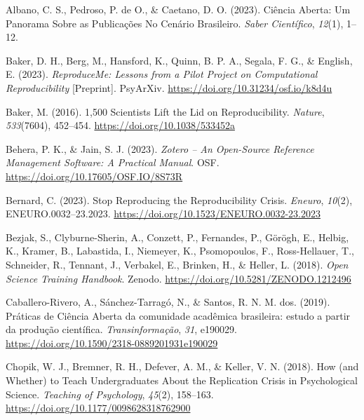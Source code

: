\documentclass[
  a4paper,
]{article}
\newlength{\cslhangindent}
\newenvironment{CSLReferences}[2] %
 {\begin{list}{}{%
  \setlength{\itemindent}{0pt}
  \setlength{\leftmargin}{0pt}
  \setlength{\parsep}{0pt}
  \ifodd #1
   \setlength{\leftmargin}{\cslhangindent}
   \setlength{\itemindent}{-1\cslhangindent}
  \fi
  \setlength{\itemsep}{#2\baselineskip}}}
 {\end{list}}
\begin{document}
\label{refs}
\begin{CSLReferences}{1}{0}
Albano, C. S., Pedroso, P. de O., \& Caetano, D. O. (2023). Ci{ê}ncia
{Aberta}: {Um Panorama} Sobre as {Publica{ç}{õ}es} No {Cen{á}rio
Brasileiro}. \emph{Saber Cient{í}fico}, \emph{12}(1), 1--12.

Baker, D. H., Berg, M., Hansford, K., Quinn, B. P. A., Segala, F. G., \&
English, E. (2023). \emph{{ReproduceMe}: Lessons from a Pilot Project on
Computational Reproducibility} {[}Preprint{]}. PsyArXiv.
\url{https://doi.org/10.31234/osf.io/k8d4u}

Baker, M. (2016). 1,500 Scientists Lift the Lid on Reproducibility.
\emph{Nature}, \emph{533}(7604), 452--454.
\url{https://doi.org/10.1038/533452a}

Behera, P. K., \& Jain, S. J. (2023). \emph{Zotero -- An Open-Source
Reference Management Software: A Practical Manual}. OSF.
\url{https://doi.org/10.17605/OSF.IO/8S73R}

Bernard, C. (2023). Stop {Reproducing} the {Reproducibility Crisis}.
\emph{Eneuro}, \emph{10}(2), ENEURO.0032--23.2023.
\url{https://doi.org/10.1523/ENEURO.0032-23.2023}

Bezjak, S., Clyburne-Sherin, A., Conzett, P., Fernandes, P., Görögh, E.,
Helbig, K., Kramer, B., Labastida, I., Niemeyer, K., Psomopoulos, F.,
Ross-Hellauer, T., Schneider, R., Tennant, J., Verbakel, E., Brinken,
H., \& Heller, L. (2018). \emph{Open {Science Training Handbook}}.
Zenodo. \url{https://doi.org/10.5281/ZENODO.1212496}

Caballero-Rivero, A., Sánchez-Tarragó, N., \& Santos, R. N. M. dos.
(2019). {Pr{á}ticas de Ci{ê}ncia Aberta da comunidade acad{ê}mica
brasileira: estudo a partir da produ{ç}{ã}o cient{í}fica}.
\emph{Transinforma{ç}{ã}o}, \emph{31}, e190029.
\url{https://doi.org/10.1590/2318-0889201931e190029}

Chopik, W. J., Bremner, R. H., Defever, A. M., \& Keller, V. N. (2018).
How (and {Whether}) to {Teach Undergraduates About} the {Replication
Crisis} in {Psychological Science}. \emph{Teaching of Psychology},
\emph{45}(2), 158--163. \url{https://doi.org/10.1177/0098628318762900}


\end{CSLReferences}
\end{document}
